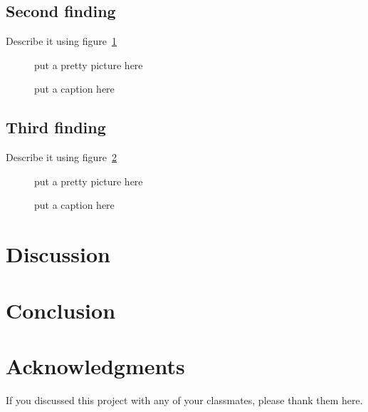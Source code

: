 \documentclass[11pt]{article}
\begin{document}
\subsection{Second finding}

Describe it using figure~\ref{fig:find2}

\begin{figure}
  \centering
    put a pretty picture here
  \caption{put a caption here}
  \label{fig:find2}
\end{figure}


\subsection{Third finding}

Describe it using figure~\ref{fig:find3}

\begin{figure}
  \centering
    put a pretty picture here
  \caption{put a caption here}
  \label{fig:find3}
\end{figure}


\section{Discussion}


\section{Conclusion}

\section*{Acknowledgments}
If you discussed this project with any of your classmates, please thank
them here.



\end{document}
